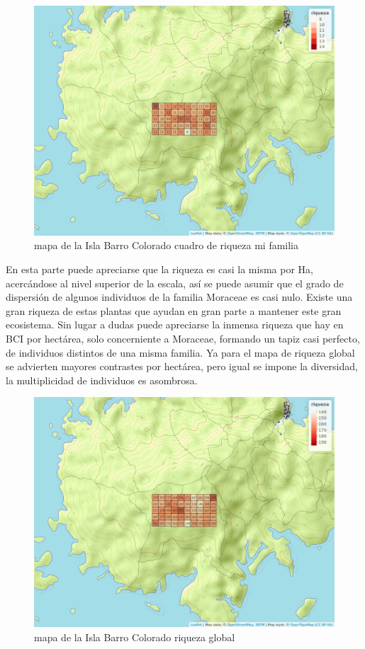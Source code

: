 \documentclass[11pt,]{article}
\begin{document}
\begin{figure}
\centering
\includegraphics[width=1.00000\textwidth]{mapa_cuadros_riq_mi_familia.png}
\caption{mapa de la Isla Barro Colorado cuadro de riqueza mi familia
\label{fig:bci_map}}
\end{figure}

En esta parte puede apreciarse que la riqueza es casi la misma por Ha,
acercándose al nivel superior de la escala, así se puede asumir que el
grado de dispersión de algunos individuos de la familia Moraceae es casi
nulo. Existe una gran riqueza de estas plantas que ayudan en gran parte
a mantener este gran ecosistema. Sin lugar a dudas puede apreciarse la
inmensa riqueza que hay en BCI por hectárea, solo concerniente a
Moraceae, formando un tapiz casi perfecto, de individuos distintos de
una misma familia. Ya para el mapa de riqueza global se advierten
mayores contrastes por hectárea, pero igual se impone la diversidad, la
multiplicidad de individuos es asombrosa.

\begin{figure}
\centering
\includegraphics[width=1.00000\textwidth]{mapa_cuadros_riq_global.png}
\caption{mapa de la Isla Barro Colorado riqueza global
\label{fig:bci_map}}
\end{figure}
\end{document}

